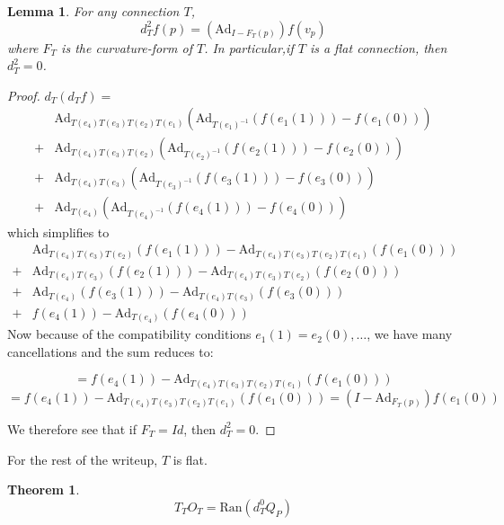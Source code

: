 \documentclass[11pt]{amsart}
\newtheorem{theorem}{Theorem}
\numberwithin{theorem}{subsection}
\newtheorem{lemma}{Lemma}
\numberwithin{lemma}{subsection}
\numberwithin{corollary}{subsection}
\numberwithin{definition}{subsection}
\numberwithin{prop}{subsection}
\begin{document}
\begin{lemma}
  For any connection $T$, 
  \[d_T^2 f(p)= (\text{Ad}_{I-F_T(p)})f(v_p)\]
  where $F_T$ is the curvature-form of $T$. In particular,if $T$ is a flat connection, then $d_T^2=0$.
\end{lemma}
\begin{proof}

$d_T (d_T f)=$
\begin{align*}
  &\text{Ad}_{T(e_4)T(e_3)T(e_2)T(e_1)}(\text{Ad}_{T(e_1)^{-1}}(f(e_1(1))) - f(e_1(0)))\\
 + &\text{Ad}_{T(e_4)T(e_3)T(e_2)}(\text{Ad}_{T(e_2)^{-1}}(f(e_2(1))) - f(e_2(0)))\\
  + &\text{Ad}_{T(e_4)T(e_3)}(\text{Ad}_{T(e_3)^{-1}}(f(e_3(1)))-f(e_3(0)))\\ 
  + &\text{Ad}_{T(e_4)}(\text{Ad}_{T(e_4)^{-1}}(f(e_4(1)))-f(e_4(0)))
\end{align*}
which simplifies to 
\begin{align*}
  &\text{Ad}_{T(e_4)T(e_3)T(e_2)}(f(e_1(1)))- \text{Ad}_{T(e_4)T(e_3)T(e_2)T(e_1)}(f(e_1(0)))\\
 + &\text{Ad}_{T(e_4)T(e_3)}(f(e_2(1))) - \text{Ad}_{T(e_4)T(e_3)T(e_2)}(f(e_2(0)))\\
  + &\text{Ad}_{T(e_4)}(f(e_3(1)))-\text{Ad}_{T(e_4)T(e_3)}(f(e_3(0)))\\ 
  + &f(e_4(1))-\text{Ad}_{T(e_4)}(f(e_4(0)))
\end{align*}
Now because of the compatibility conditions $e_1(1)=e_2(0),\dots$, we have many cancellations and the sum reduces to:

\[=f(e_4(1)) - \text{Ad}_{T(e_4)T(e_3)T(e_2)T(e_1)}(f(e_1(0)))\]
\[=f(e_4(1)) - \text{Ad}_{T(e_4)T(e_3)T(e_2)T(e_1)}(f(e_1(0))) = (I-\text{Ad}_{F_T(p)})f(e_1(0))\]

We therefore see that if $F_T=Id$, then $d_T^2=0$.
\end{proof}
For the rest of the writeup, $T$ is flat.
\begin{theorem}

\[T_{T}O_T =\text{Ran}(d_T^0Q_P)\]

\end{theorem}
\end{document}
